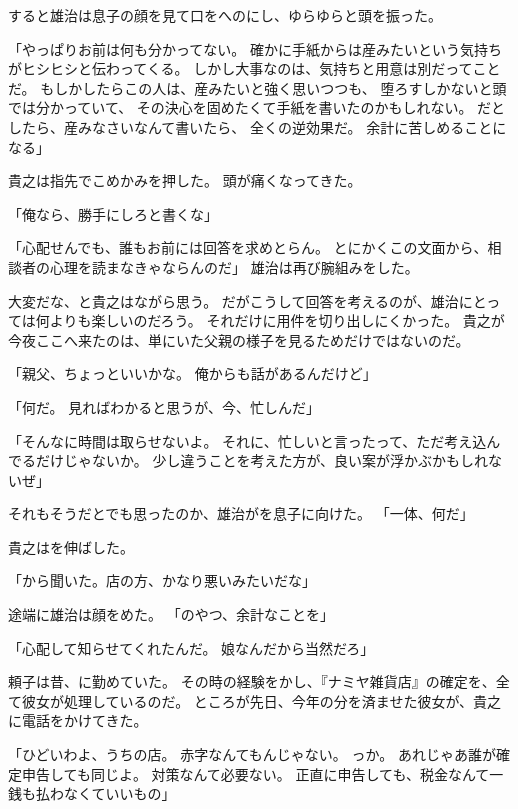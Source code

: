 \documentclass[chapter3.tex]{subfiles}
\begin{document}
\begin{CJK}{UTF8}{ipxm}
    すると雄治は息子の顔を見て口をへのにし、ゆらゆらと頭を振った。
    
    「やっぱりお前は何も分かってない。
    確かに手紙からは産みたいという気持ちがヒシヒシと伝わってくる。
    しかし大事なのは、気持ちと用意は別だってことだ。
    もしかしたらこの人は、産みたいと強く思いつつも、
    堕ろすしかないと頭では分かっていて、
    その決心を固めたくて手紙を書いたのかもしれない。
    だとしたら、産みなさいなんて書いたら、
    全くの逆効果だ。
    余計に苦しめることになる」

    貴之は指先でこめかみを押した。
    頭が痛くなってきた。

    「俺なら、勝手にしろと書くな」

    「心配せんでも、誰もお前には回答を求めとらん。
    とにかくこの文面から、相談者の心理を読まなきゃならんのだ」
    雄治は再び腕組みをした。

    大変だな、と貴之はながら思う。
    だがこうして回答を考えるのが、雄治にとっては何よりも楽しいのだろう。
    それだけに用件を切り出しにくかった。
    貴之が今夜ここへ来たのは、単にいた父親の様子を見るためだけではないのだ。

    「親父、ちょっといいかな。
    俺からも話があるんだけど」

    「何だ。
    見ればわかると思うが、今、忙しんだ」

    「そんなに時間は取らせないよ。
    それに、忙しいと言ったって、ただ考え込んでるだけじゃないか。
    少し違うことを考えた方が、良い案が浮かぶかもしれないぜ」

    それもそうだとでも思ったのか、雄治がを息子に向けた。
    「一体、何だ」

    貴之はを伸ばした。

    「から聞いた。店の方、かなり悪いみたいだな」

    途端に雄治は顔をめた。
    「のやつ、余計なことを」

    「心配して知らせてくれたんだ。
    娘なんだから当然だろ」

    頼子は昔、に勤めていた。
    その時の経験をかし、『ナミヤ雑貨店』の確定を、全て彼女が処理しているのだ。
    ところが先日、今年の分を済ませた彼女が、貴之に電話をかけてきた。

    「ひどいわよ、うちの店。
    赤字なんてもんじゃない。
    っか。
    あれじゃあ誰が確定申告しても同じよ。
    対策なんて必要ない。
    正直に申告しても、税金なんて一銭も払わなくていいもの」


\end{CJK}
\end{document}
